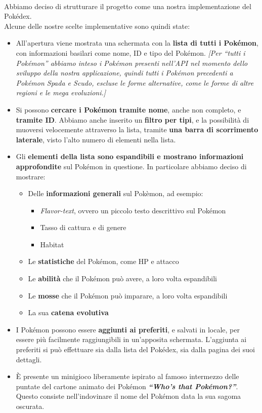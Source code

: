 \documentclass[a4paper,11pt]{article}
\begin{document}
  		\paragraph{}
  			Abbiamo deciso di strutturare il progetto come una nostra implementazione del Pokédex. \\ 
Alcune delle nostre scelte implementative sono quindi state:
		\begin{itemize}
			\item All’apertura viene mostrata una schermata con la \textbf{lista di tutti i Pokémon}, con informazioni basilari come nome, ID e tipo del Pokémon. \textit{[Per “tutti i Pokémon” abbiamo inteso i Pokémon presenti nell’API nel momento dello sviluppo della nostra applicazione, quindi tutti i Pokémon precedenti a Pokémon Spada e Scudo, escluse le forme alternative, come le forme di altre regioni e le mega evoluzioni.]}
			\item Si possono \textbf{cercare i Pokémon tramite nome}, anche non completo, e \textbf{tramite ID}. Abbiamo anche inserito un \textbf{filtro per tipi}, e la possibilità di muoversi velocemente attraverso la lista, tramite \textbf{una barra di scorrimento laterale}, visto l’alto numero di elementi nella lista.
			\item Gli \textbf{elementi della lista sono espandibili e mostrano informazioni approfondite} sul Pokémon in questione. In particolare abbiamo deciso di mostrare:
				\begin{itemize}
					\item Delle \textbf{informazioni generali} sul Pokèmon, ad esempio:
						\begin{itemize}
							\item \textit{Flavor-text}, ovvero un piccolo testo descrittivo sul Pokémon
							\item Tasso di cattura e di genere
							\item Habitat
						\end{itemize}
					\item Le \textbf{statistiche} del Pokémon, come HP e attacco
					\item Le \textbf{abilità} che il Pokémon può avere, a loro volta espandibili
					\item Le \textbf{mosse} che il Pokémon può imparare, a loro volta espandibili	
					\item La sua \textbf{catena evolutiva}
				\end{itemize}
			\item I Pokémon possono essere \textbf{aggiunti ai preferiti}, e salvati in locale, per essere più facilmente raggiungibili in un’apposita schermata. L’aggiunta ai preferiti si può effettuare sia dalla lista del Pokédex, sia dalla pagina dei suoi dettagli.
			\item È presente un minigioco liberamente ispirato al famoso intermezzo delle puntate del cartone animato dei Pokémon \textbf{\textit{“Who's that Pokémon?”}}. Questo consiste nell’indovinare il nome del Pokémon data la sua sagoma oscurata.
		\end{itemize}\newpage
\end{document}
